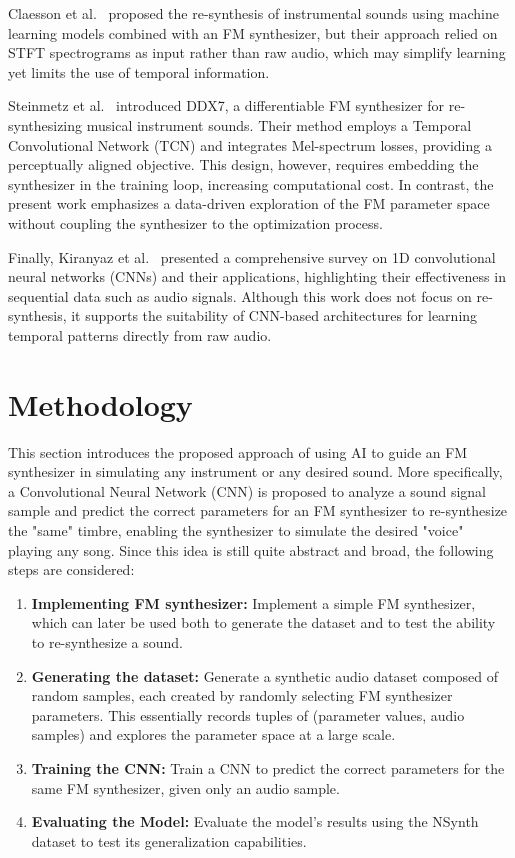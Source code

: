 \documentclass[10pt,conference]{IEEEtran}
\begin{document}
Claesson et al.\ \cite{claesson2021resynthesis} proposed the re-synthesis of instrumental sounds using machine learning models combined with an FM synthesizer, but their approach relied on STFT spectrograms as input rather than raw audio, which may simplify learning yet limits the use of temporal information.

Steinmetz et al.\ \cite{steinmetz2022ddx7} introduced DDX7, a differentiable FM synthesizer for re-synthesizing musical instrument sounds. Their method employs a Temporal Convolutional Network (TCN) and integrates Mel-spectrum losses, providing a perceptually aligned objective. This design, however, requires embedding the synthesizer in the training loop, increasing computational cost. In contrast, the present work emphasizes a data-driven exploration of the FM parameter space without coupling the synthesizer to the optimization process.

Finally, Kiranyaz et al.\ \cite{kiranyaz2021survey} presented a comprehensive survey on 1D convolutional neural networks (CNNs) and their applications, highlighting their effectiveness in sequential data such as audio signals. Although this work does not focus on re-synthesis, it supports the suitability of CNN-based architectures for learning temporal patterns directly from raw audio.

\section{Methodology} \label{sec:our_proposal}

This section introduces the proposed approach of using AI to guide an FM synthesizer in simulating any instrument or any desired sound. More specifically, a Convolutional Neural Network (CNN) is proposed to analyze a sound signal sample and predict the correct parameters for an FM synthesizer to re-synthesize the "same" timbre, enabling the synthesizer to simulate the desired "voice" playing any song. Since this idea is still quite abstract and broad, the following steps are considered:

\begin{enumerate}
    \item \textbf{Implementing FM synthesizer:} Implement a simple FM synthesizer, which can later be used both to generate the dataset and to test the ability to re-synthesize a sound.
    \item \textbf{Generating the dataset:} Generate a synthetic audio dataset composed of random samples, each created by randomly selecting FM synthesizer parameters. This essentially records tuples of (parameter values, audio samples) and explores the parameter space at a large scale.
    \item \textbf{Training the CNN:} Train a CNN to predict the correct parameters for the same FM synthesizer, given only an audio sample.
    \item \textbf{Evaluating the Model:} Evaluate the model's results using the NSynth dataset to test its generalization capabilities.
\end{enumerate}
\end{document}
